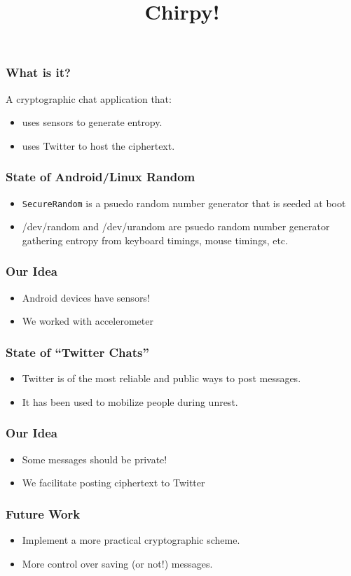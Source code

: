 \documentclass{beamer}
\title{Chirpy!}
\begin{document}
\begin{frame}
    \maketitle
\end{frame}

\begin{frame}
    \frametitle{What is it?}
    A cryptographic chat application that:
    \begin{itemize}
        \item 
            uses sensors to generate entropy.
        \item
            uses Twitter to host the ciphertext.
    \end{itemize}
\end{frame}

\begin{frame}
    \frametitle{State of Android/Linux Random}
    \begin{itemize}
        \item 
            \texttt{SecureRandom} is a psuedo random number generator that is seeded
            at boot
        \item
            /dev/random and /dev/urandom are psuedo random number generator
            gathering entropy from keyboard timings, mouse timings, etc.
    \end{itemize}
\end{frame}

\begin{frame}
    \frametitle{Our Idea}
    \begin{itemize}
        \item
            Android devices have sensors!
        \item
            We worked with accelerometer
    \end{itemize}
\end{frame} 

\begin{frame}
    \frametitle{State of ``Twitter Chats''}
    \begin{itemize}
        \item
            Twitter is of the most reliable and public ways to post messages.
        \item
            It has been used to mobilize people during unrest.
    \end{itemize}
\end{frame}

\begin{frame}
    \frametitle{Our Idea}
    \begin{itemize}
        \item 
            Some messages should be private!
        \item
            We facilitate posting ciphertext to Twitter
    \end{itemize}
\end{frame}

\begin{frame}
    \frametitle{Future Work}
    \begin{itemize}
        \item 
            Implement a more practical cryptographic scheme.
        \item
            More control over saving (or not!) messages.
    \end{itemize}
    
\end{frame}
\end{document}
